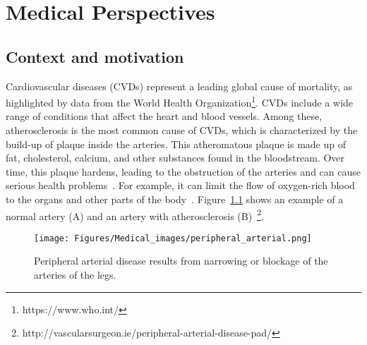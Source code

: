 \chapter{Medical Perspectives}
\label{chap:medical_perspectives}
\localtableofcontents
\pagebreak

  



\section{Context and motivation}


Cardiovascular diseases (CVDs) represent a leading global cause of mortality, as
highlighted by data from the World Health Organization\footnote{https://www.who.int/}. 
CVDs include a wide range of conditions that affect the heart and blood vessels.
Among these, atherosclerosis is the most common cause of CVDs, which 
is characterized by the build-up of plaque inside the arteries.
This atheromatous plaque is made up of fat, cholesterol,
calcium, and other substances found in the bloodstream.
Over time, this plaque hardens, leading to the obstruction of the arteries
and can cause serious health problems~\citep{insull2009pathology}. 
For example, it can limit the flow of oxygen-rich blood to the organs 
and other parts of the
body~\citep{rafieian2014atherosclerosis}.
Figure~\ref{fig:data_arteria}
shows an example of a normal artery (A) and an artery
with atherosclerosis (B)~\footnote{http://vascularsurgeon.ie/peripheral-arterial-disease-pad/}.

\begin{figure}[htb!]
    \centering
    \texttt{[image: Figures/Medical\_images/peripheral\_arterial.png]}  
    \caption{Peripheral arterial disease results from narrowing or
    blockage of the arteries of the  legs.}
    \label{fig:data_arteria}
\end{figure}


